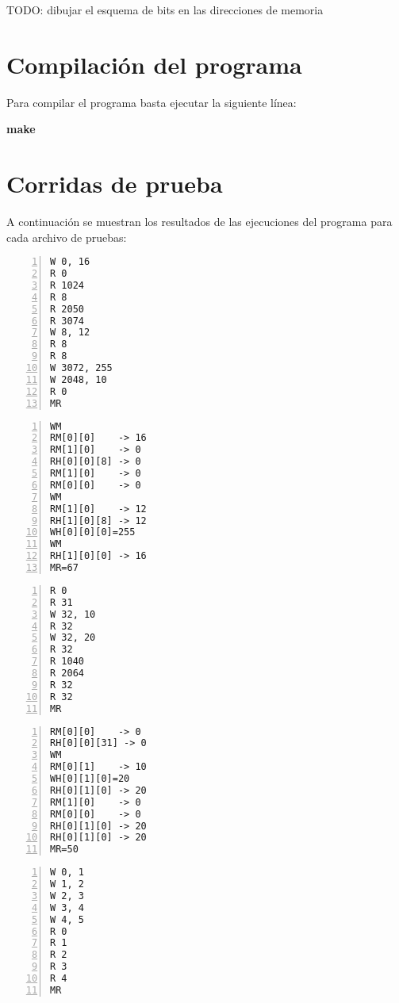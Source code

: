 \documentclass[11pt,a4paper]{article}
\begin{document}
TODO: dibujar el esquema de bits en las direcciones de memoria

\section{Compilación del programa}

Para compilar el programa basta ejecutar la siguiente línea:

\begin{center}
\textbf{make}
\end{center}

\section{Corridas de prueba}

A continuación se muestran los resultados de las ejecuciones del programa para cada archivo de pruebas:

\begin{lstlisting}[numbers=left, tabsize=2, basicstyle=\fontsize{11}{13}\ttfamily, frame=single, caption={prueba1.mem}]
W 0, 16
R 0
R 1024
R 8
R 2050
R 3074
W 8, 12
R 8
R 8
W 3072, 255
W 2048, 10
R 0
MR
\end{lstlisting}

\begin{lstlisting}[numbers=left, tabsize=2, basicstyle=\fontsize{11}{13}\ttfamily, frame=single, caption={Resultado prueba1.mem}]
WM
RM[0][0]    -> 16
RM[1][0]    -> 0
RH[0][0][8] -> 0
RM[1][0]    -> 0
RM[0][0]    -> 0
WM
RM[1][0]    -> 12
RH[1][0][8] -> 12
WH[0][0][0]=255
WM
RH[1][0][0] -> 16
MR=67
\end{lstlisting}

\begin{lstlisting}[numbers=left, tabsize=2, basicstyle=\fontsize{11}{13}\ttfamily, frame=single, caption={prueba2.mem}]
R 0
R 31
W 32, 10
R 32
W 32, 20
R 32
R 1040
R 2064
R 32
R 32
MR
\end{lstlisting}

\begin{lstlisting}[numbers=left, tabsize=2, basicstyle=\fontsize{11}{13}\ttfamily, frame=single, caption={Resultado prueba2.mem}]
RM[0][0]    -> 0
RH[0][0][31] -> 0
WM
RM[0][1]    -> 10
WH[0][1][0]=20
RH[0][1][0] -> 20
RM[1][0]    -> 0
RM[0][0]    -> 0
RH[0][1][0] -> 20
RH[0][1][0] -> 20
MR=50
\end{lstlisting}

\begin{lstlisting}[numbers=left, tabsize=2, basicstyle=\fontsize{11}{13}\ttfamily, frame=single, caption={prueba3.mem}]
W 0, 1
W 1, 2
W 2, 3
W 3, 4
W 4, 5
R 0
R 1
R 2
R 3
R 4
MR
\end{lstlisting}
\end{document}
